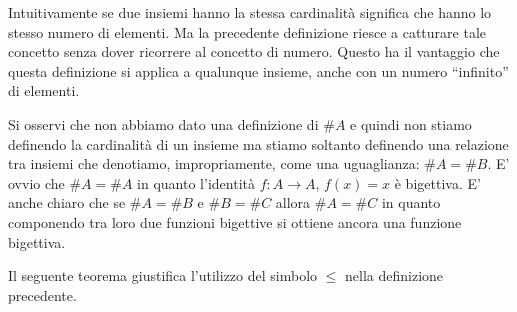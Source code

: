 Intuitivamente se due insiemi hanno la stessa cardinalità 
significa che hanno lo stesso numero di elementi.
Ma la precedente definizione riesce a catturare tale concetto senza dover 
ricorrere al concetto di numero. 
Questo ha il vantaggio che questa definizione si applica a qualunque insieme, anche 
con un numero ``infinito'' di elementi.

Si osservi che non abbiamo dato una definizione di $\#A$ e quindi non stiamo 
definendo la cardinalità di un insieme ma stiamo soltanto definendo 
una relazione tra insiemi che 
denotiamo, impropriamente, come una uguaglianza: $\#A = \#B$.
E' ovvio che $\#A = \#A$ in quanto l'identità $f\colon A\to A$, $f(x)=x$ è bigettiva.
E' anche chiaro che se $\#A = \#B$ e $\#B = \#C$ allora $\#A = \#C$ in quanto 
componendo tra loro due funzioni bigettive si ottiene ancora una funzione 
bigettiva.

Il seguente teorema
giustifica l'utilizzo del simbolo $\le$ nella definizione precedente.

